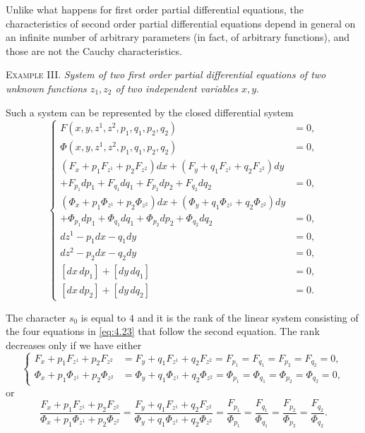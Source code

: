 Unlike what happens for first order partial differential equations, the characteristics of second order partial differential equations depend in general on an infinite number of arbitrary parameters (in fact, of arbitrary functions), and those are not the Cauchy characteristics. 

\vspace{12pt}\fsec \textsc{Example III.} \emph{System of two first order partial differential equations of two unknown functions $z_{1}, z_{2}$ of two independent variables $x,y$}.

Such a system can be represented by the closed differential system
\begin{equation}
  \label{eq:4.23}
  \left\{
    \begin{aligned}
      F(x,y,z^{1},z^{2},p_{1},q_{1},p_{2},q_{2})&=0,\\
      \Phi(x,y,z^{1},z^{2},p_{1},q_{1},p_{2},q_{2})&=0,\\
      (F_{x}+p_{1}F_{z^{1}}+p_{2}F_{z^{2}})dx+(F_{y}+q_{1}F_{z^{1}}+q_{2}F_{z^{2}})dy\\
      +F_{p_{1}}dp_{1}+F_{q_{1}}dq_{1}+F_{p_{2}}dp_{2}+F_{q_{2}}dq_{2}&=0,\\
      (\Phi_{x}+p_{1}\Phi_{z^{1}}+p_{2}\Phi_{z^{2}})dx+(\Phi_{y}+q_{1}\Phi_{z^{1}}+q_{2}\Phi_{z^{2}})dy\\
      +\Phi_{p_{1}}dp_{1}+\Phi_{q_{1}}dq_{1}+\Phi_{p_{2}}dp_{2}+\Phi_{q_{2}}dq_{2}&=0,\\
      dz^{1}-p_{1}dx-q_{1}dy&=0,\\
      dz^{2}-p_{2}dx-q_{2}dy&=0,\\
      [dx\,dp_{1}]+[dy\,dq_{1}]&=0,\\
      [dx\,dp_{2}]+[dy\,dq_{2}]&=0.
    \end{aligned}
  \right.
\end{equation}

The character $s_{0}$ is equal to $4$ and it is the rank of the linear system consisting of the four equations in \eqref{eq:4.23} that follow the second equation. The rank decreases only if we have either
\begin{equation}
  \label{eq:4.24}
  \left\{
    \begin{aligned}
      F_{x}+p_{1}F_{z^{1}}+p_{2}F_{z^{2}}&=F_{y}+q_{1}F_{z^{1}}+q_{2}F_{z^{2}}=F_{p_{1}}=F_{q_{1}}=F_{p_{2}}=F_{q_{2}}=0,\\
      \Phi_{x}+p_{1}\Phi_{z^{1}}+p_{2}\Phi_{z^{2}}&=\Phi_{y}+q_{1}\Phi_{z^{1}}+q_{2}\Phi_{z^{2}}=\Phi_{p_{1}}=\Phi_{q_{1}}=\Phi_{p_{2}}=\Phi_{q_{2}}=0,
    \end{aligned}
  \right.
\end{equation}
or
\begin{equation}
  \label{eq:4.25}
  \frac{F_{x}+p_{1}F_{z^{1}}+p_{2}F_{z^{2}}}{\Phi_{x}+p_{1}\Phi_{z^{1}}+p_{2}\Phi_{z^{2}}}=\frac{F_{y}+q_{1}F_{z^{1}}+q_{2}F_{z^{2}}}{\Phi_{y}+q_{1}\Phi_{z^{1}}+q_{2}\Phi_{z^{2}}}=\frac{F_{p_{1}}}{\Phi_{p_{1}}}=\frac{F_{q_{1}}}{\Phi_{q_{1}}}=\frac{F_{p_{2}}}{\Phi_{p_{2}}}=\frac{F_{q_{2}}}{\Phi_{q_{2}}}.
\end{equation}

